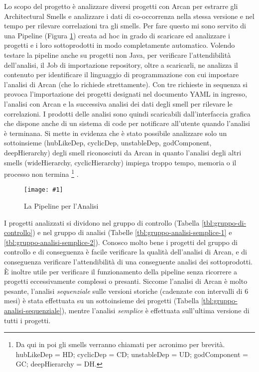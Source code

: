 \documentclass[a4paper,11pt,oneside, table]{article}
\newcommand{\putimage}[4] {
  \begin{figure}[H]
    \centering
    \texttt{[image: \#1]}
    \caption{#2}\label{#3}
  \end{figure}
}
\begin{document}
Lo scopo del progetto \`e analizzare diversi progetti con Arcan \cite{fontana2017arcan} per estrarre gli Architectural Smells e analizzare i dati di co-occorrenza nella stessa versione e nel tempo per rilevare correlazioni tra gli smells. Per fare questo mi sono servito di una Pipeline \cite{pipelineRepo} (Figura \ref{png:pipeline}) creata ad hoc in grado di scaricare ed analizzare i progetti e i loro sottoprodotti in modo completamente automatico. Volendo testare la pipeline anche su progetti non Java, per verificare l'attendibilit\`a dell'analisi, il Job di importazione repository, oltre a scaricarli, ne analizza il contenuto per identificare il linguaggio di programmazione con cui impostare l'analisi di Arcan (che lo richiede strettamente). Con tre richieste in sequenza si provoca l'importazione dei progetti designati nel documento YAML in ingresso, l'analisi con Arcan e la successiva analisi dei dati degli smell per rilevare le correlazioni. I prodotti delle analisi sono quindi scaricabili dall'interfaccia grafica che dispone anche di un sistema di code per notificare all'utente quando l'analisi \`e terminana. Si mette in evidenza che \`e stato possibile analizzare solo un sottoinsieme (hubLikeDep, cyclicDep, unstableDep, godComponent, deepHierarchy) degli smell riconosciuti da Arcan in quanto l'analisi degli altri smells (wideHierarchy, cyclicHierarchy) impiega troppo tempo, memoria o il processo non termina
\footnote{
  Da qui in poi gli smells verranno chiamati per acronimo per brevit\`a.
  hubLikeDep = HD; cyclicDep = CD; unstableDep = UD; godComponent = GC; deepHierarchy = DH.
}
.

\putimage{images/pipeline.png}{La Pipeline per l'Analisi}{png:pipeline}{1}

I progetti analizzati si dividono nel gruppo di controllo (Tabella \ref{tbl:gruppo-di-controllo}) e nel gruppo di analisi (Tabelle \ref{tbl:gruppo-analisi-semplice-1} e \ref{tbl:gruppo-analisi-semplice-2}). Conosco molto bene i progetti del gruppo di controllo e di conseguenza \`e facile verificare la qualit\`a dell'analisi di Arcan, e di conseguenza verificare l'attendibilit\`a di una conseguente analisi dei sottoprodotti. \`E inoltre utile per verificare il funzionamento della pipeline senza ricorrere a progetti eccessivamente complessi o presanti. Siccome l'analisi di Arcan \`e molto pesante, l'analisi \textit{sequenziale} sulle versioni storiche (cadenzate con intervalli di 6 mesi) \`e stata effettuata su un sottoinsieme dei progetti (Tabella \ref{tbl:gruppo-analisi-sequenziale}), mentre l'analisi \textit{semplice} \`e effettuata sull'ultima versione di tutti i progetti.
\end{document}
